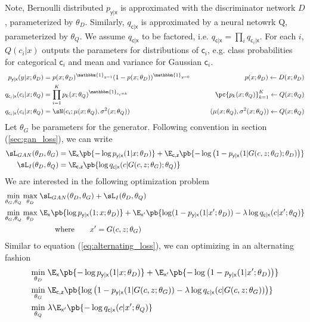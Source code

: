 \documentclass[11pt]{article}
\newcommand\ry{\ensuremath{\mathsf{y}}}
\newcommand\rx{\ensuremath{\mathsf{x}}}
\newcommand\rc{\ensuremath{\mathsf{c}}}
\newcommand\rz{\ensuremath{\mathsf{z}}}
\begin{document}
Note, Bernoulli distributed $p_{\ry|\rx}$ is approximated with the discriminator network $D$, parameterized by $\theta_D$. Similarly, $q_{\rc|\rx}$ is approximated by a neural netowrk Q, parameterized by $\theta_Q$. We assume $q_{\rc|\rx}$ to be factored, i.e. $q_{\rc|\rx} = \prod_i q_{\rc_i|\rx}$. For each $i$, $Q(c_i|x)$ outputs the parameters for distributions of $\rc_i$, e.g. class probabilities for categorical $\rc_i$ and mean and variance for Gaussian $\rc_i$.
\begin{align*}
    p_{\ry|\rx}(y|x;\theta_D) 
        &= p(x;\theta_D)^{\mathbbm{1}_{y=1}} ( 1-p(x;\theta_D) )^{\mathbbm{1}_{y=0}}
        &\quad\quad p(x;\theta_D) \leftarrow D(x;\theta_D) \\
    q_{\rc_i|\rx}(c_i|x;\theta_Q) 
        &= \prod_{i=1}^K p_k(x;\theta_Q)^{\mathbbm{1}_{c_i=k}}
        &\quad\quad \pc{p_k(x;\theta_Q)}_{k=1}^K \leftarrow Q(x;\theta_Q) \\
    q_{\rc_i|\rx}(c_i|x;\theta_Q) 
        &= \sN(c_i; \mu(x;\theta_Q), \sigma^2(x;\theta_Q))
        &\quad\quad (\mu(x;\theta_Q), \sigma^2(x;\theta_Q)) \leftarrow Q(x;\theta_Q)
\end{align*}
Let $\theta_G$ be parameters for the generator. Following convention in section (\ref{sec:gan_loss}), we can write
\begin{align*}
    \sL_{GAN}(\theta_D,\theta_G) 
        &= \E_{\rx}\pb{ -\log p_{\ry|\rx}(1|x;\theta_D) } +  \E_{\rc,\rz}\pb{ -\log \left( 1- p_{\ry|\rx}(1|G(c,z;\theta_G);\theta_D) \right) }    \\
    \sL_{I}(\theta_D,\theta_Q)
        &= \E_{\rc,\rz}\pb{ \log q_{\rc|\rx}(c|G(c,z;\theta_G);\theta_Q) } 
\end{align*}
We are interested in the following optimization problem
\begin{align*}
    \min_{\theta_G,\theta_Q} \max_{\theta_D} \;
        &\sL_{GAN}(\theta_D,\theta_G) + \sL_{I}(\theta_D,\theta_Q) \\
    \min_{\theta_G,\theta_Q} \max_{\theta_D} \;
        &\E_{\rx}\pb{\log p_{\ry|\rx}(1;x;\theta_D)} + \E_{\rx'} \pb{ \log (1-p_{\ry|\rx}(1|x';\theta_D))- \lambda \log q_{\rc|\rx}(c|x';\theta_Q) }\\
        &\quad\quad\text{where}\quad\quad x' = G(c,z;\theta_G)
\end{align*}
Similar to equation (\ref{eq:alternating_loss}), we can optimizing in an alternating fashion
\begin{align*}
    \min_{\theta_D} \;
        &\E_{\rx}\pb{ -\log p_{\ry|\rx}(1|x;\theta_D) } + \E_{\rx'}\pb{ -\log \left( 1- p_{\ry|\rx}(1|x';\theta_D) \right) }  \\
    \min_{\theta_G} \;
        &\E_{\rc,\rz}\pb{ \log \left( 1- p_{\ry|\rx}(1|G(c,z;\theta_G)) - \lambda \log q_{\rc|\rx}(c|G(c,z;\theta_G))  \right)  } \\
    \min_{\theta_Q} \;
        &\lambda \E_{\rx'}\pb{ -\log q_{\rc|\rx}(c|x';\theta_Q) }
\end{align*}
\end{document}
